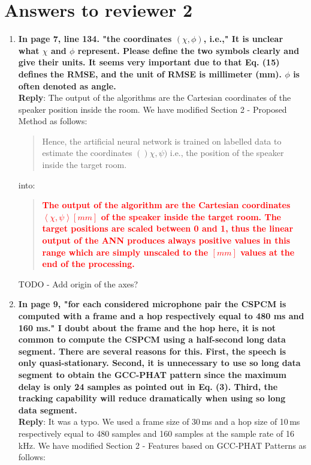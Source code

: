 \documentclass[11pt, technote, letterpaper, oneside, onecolumn]{IEEEtran}
\begin{document}
\section{Answers to reviewer 2}\label{sec:rev2}
\begin{enumerate}
\item \textbf{In page 7, line 134. "the coordinates $(\chi,\phi)$, i.e.," It is unclear what $\chi$ and $\phi$ represent. Please define the two symbols clearly and give their units. It seems very important due to that Eq. (15) defines the RMSE, and the unit of RMSE is millimeter (mm). $\phi$ is often denoted as angle.\\}
\textbf{Reply}:  The output of the algorithms are the Cartesian coordinates of the speaker position inside the room. We have modified Section 2 - Proposed Method as follows:
\begin{quote}
	Hence, the artificial neural network is trained on labelled data to estimate the coordinates $()\chi,\psi)$ i.e., the position of the speaker inside the target room.
\end{quote}
into:
\begin{quote}
	\textcolor{red}{\textbf{The output of the algorithm are the Cartesian coordinates $\left \langle \chi,\psi \right \rangle \left [mm\right ]$ of the speaker inside the target room. The target positions are scaled between 0 and 1, thus the linear output of the ANN produces always positive values in this range which are simply unscaled to the $\left [mm\right ]$ values at the end of the processing.}}
\end{quote}
TODO - Add origin of the axes?

\item  \textbf{In page 9, "for each considered microphone pair the CSPCM is computed with a frame and a hop respectively equal to 480 ms and 160 ms." I doubt about the frame and the hop here, it is not common to compute the CSPCM using a half-second long data segment. There are several reasons for this. First, the speech is only quasi-stationary. Second, it is unnecessary to use so long data segment to obtain the GCC-PHAT pattern since the maximum delay is only 24 samples as pointed out in Eq. (3). Third, the tracking capability will reduce dramatically when using so long data segment.\\}
\textbf{Reply}:  It was a typo. We used a frame size of 30\,ms and a hop size of 10\,ms respectively equal to 480 samples and 160 samples at the sample rate of 16\,kHz. We have modified Section 2 - Features based on GCC-PHAT Patterns as follows:


\end{enumerate}
\end{document}
